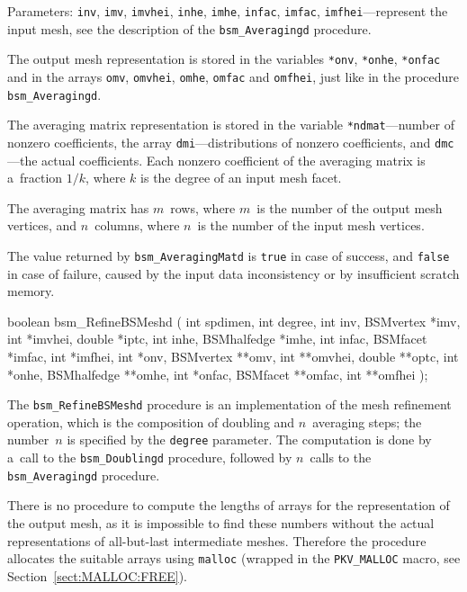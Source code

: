 Parameters: \texttt{inv}, \texttt{imv}, \texttt{imvhei}, \texttt{inhe},
\texttt{imhe}, \texttt{infac}, \texttt{imfac}, \texttt{imfhei}---represent
the input mesh, see the description of the \texttt{bsm\_Averagingd}
procedure.

The output mesh representation is stored in the variables \texttt{*onv},
\texttt{*onhe}, \texttt{*onfac} and in the arrays \texttt{omv},
\texttt{omvhei}, \texttt{omhe}, \texttt{omfac} and \texttt{omfhei}, just
like in the procedure \texttt{bsm\_Averagingd}.

The averaging matrix representation is stored in the variable
\texttt{*ndmat}---number of nonzero coefficients, the array
\texttt{dmi}---distributions of nonzero coefficients, and \texttt{dmc}---the
actual coefficients. Each nonzero coefficient of the averaging matrix is
a~fraction $1/k$, where $k$ is the degree of an input mesh facet.

The averaging matrix has $m$~rows, where $m$~is the number of the output
mesh vertices, and $n$~columns, where $n$~is the number of the input mesh
vertices.

The value returned by \texttt{bsm\_AveragingMatd} is \texttt{true} in case of
success, and \texttt{false} in case of failure, caused by the input data
inconsistency or by insufficient scratch memory.


\medskip
\begin{listingC}
boolean bsm_RefineBSMeshd ( int spdimen, int degree,
            int inv, BSMvertex *imv, int *imvhei, double *iptc,
            int inhe, BSMhalfedge *imhe,
            int infac, BSMfacet *imfac, int *imfhei,
            int *onv, BSMvertex **omv, int **omvhei, double **optc,
            int *onhe, BSMhalfedge **omhe,
            int *onfac, BSMfacet **omfac, int **omfhei );

\end{listingC}
The \texttt{bsm\_RefineBSMeshd} procedure is an implementation of the mesh
refinement operation, which is the composition of doubling and $n$~averaging
steps; the number~$n$ is specified by the \texttt{degree} parameter.
The computation is done by a~call to the \texttt{bsm\_Doublingd} procedure,
followed by $n$~calls to the \texttt{bsm\_Averagingd} procedure.

There is no procedure to compute the lengths of arrays for the
representation of the output mesh, as it is impossible to find these numbers
without the actual representations of all-but-last intermediate meshes.
Therefore the procedure allocates the suitable arrays using \texttt{malloc}
(wrapped in the \texttt{PKV\_MALLOC} macro, see
Section~\ref{sect:MALLOC:FREE}).

